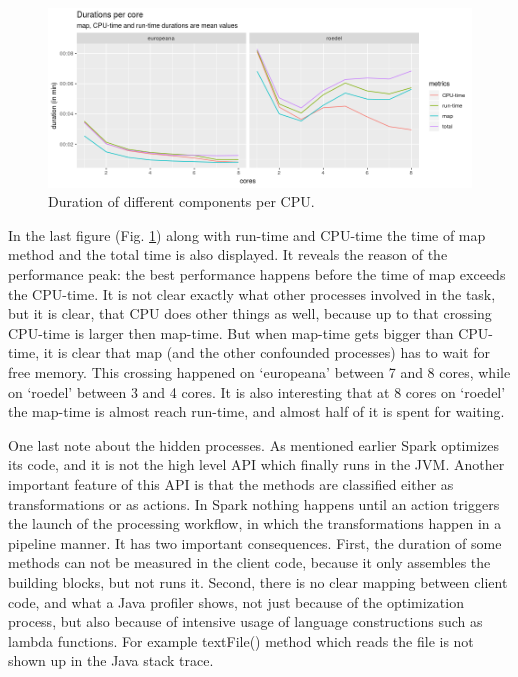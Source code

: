 \begin{figure}
\includegraphics[width=\textwidth]{images/chapter06/all-durations.png}
\caption{Duration of different components per CPU.}
\label{all-durations}
\end{figure}

In the last figure (Fig. \ref{all-durations}) along with run-time and CPU-time the time of map method and the total time is also displayed. It reveals the reason of the performance peak: the best performance happens before the time of map exceeds the CPU-time. It is not clear exactly what other processes involved in the task, but it is clear, that CPU does other things as well, because up to that crossing CPU-time is larger then map-time. But when map-time gets bigger than CPU-time, it is clear that map (and the other confounded processes) has to wait for free memory. This crossing happened on `europeana' between 7 and 8 cores, while on `roedel' between 3 and 4 cores. It is also interesting that at 8 cores on `roedel' the map-time is almost reach run-time, and almost half of it is spent for waiting.

One last note about the hidden processes. As mentioned earlier Spark optimizes its code, and it is not the high level API which finally runs in the JVM. Another important feature of this API is that the methods are classified either as transformations or as actions. In Spark nothing happens until an action triggers the launch of the processing workflow, in which the transformations happen in a pipeline manner. It has two important consequences. First, the duration of some methods can not be measured in the client code, because it only assembles the building blocks, but not runs it. Second, there is no clear mapping between client code, and what a Java profiler shows, not just because of the optimization process, but also because of intensive usage of language constructions such as lambda functions. For example textFile() method which reads the file is not shown up in the Java stack trace.

